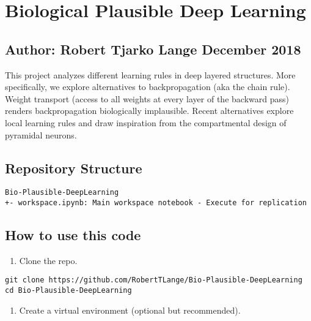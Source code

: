 \hypertarget{biological-plausible-deep-learning}{%
\section*{Biological Plausible Deep
Learning}\label{biological-plausible-deep-learning}}

\hypertarget{author-robert-tjarko-lange-december-2018}{%
\subsection*{Author: Robert Tjarko Lange \textbar{} December
2018}\label{author-robert-tjarko-lange-december-2018}}

This project analyzes different learning rules in deep layered
structures. More specifically, we explore alternatives to
backpropagation (aka the chain rule). Weight transport (access to all
weights at every layer of the backward pass) renders backpropagation
biologically implausible. Recent alternatives explore local learning
rules and draw inspiration from the compartmental design of pyramidal
neurons.


\hypertarget{repository-structure}{%
\subsection*{Repository Structure}\label{repository-structure}}

\begin{verbatim}
Bio-Plausible-DeepLearning
+- workspace.ipynb: Main workspace notebook - Execute for replication
\end{verbatim}

\hypertarget{how-to-use-this-code}{%
\subsection*{How to use this code}\label{how-to-use-this-code}}

\begin{enumerate}
\def\labelenumi{\arabic{enumi}.}
\tightlist
\item
  Clone the repo.
\end{enumerate}

\begin{verbatim}
git clone https://github.com/RobertTLange/Bio-Plausible-DeepLearning
cd Bio-Plausible-DeepLearning
\end{verbatim}

\begin{enumerate}
\def\labelenumi{\arabic{enumi}.}
\setcounter{enumi}{1}
\tightlist
\item
  Create a virtual environment (optional but recommended).
\end{enumerate}


